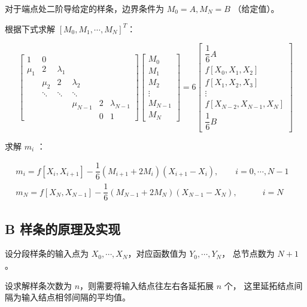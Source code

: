 \documentclass[lang=cn,a4paper,newtx,bibend=bibtex]{elegantpaper}
\begin{document}
对于端点处二阶导给定的样条，边界条件为 $M_0 = A, M_N = B$ （给定值）。

根据下式求解 $[M_0, M_1, \cdots, M_N]^T$：

\[
\begin{bmatrix}
  1 & 0 & & & & \\
  \mu_1 & 2 & \lambda_1 & & & \\
  & \mu_2 & 2 & \lambda_2 & &\\
  & \ddots & \ddots & \ddots & & \\
  & & & \mu_{N-1} & 2 & \lambda_{N-1} \\
  & & & & 0 & 1
\end{bmatrix}  
\begin{bmatrix}
  M_0 \\
  M_1 \\
  M_2 \\
  \vdots \\
  M_{N-1} \\
  M_N
\end{bmatrix}
 = 6
 \begin{bmatrix}
  \dfrac16 A\\
  f[X_0, X_1, X_2]\\
  f[X_1, X_2, X_3] \\
  \vdots \\
  f[X_{N-2}, X_{N-1}, X_N] \\
  \dfrac16 B
\end{bmatrix}
\]

求解 $m_i$ ：

\begin{equation*}
  \begin{aligned}
    m_i = f[X_i, X_{i + 1}] - \dfrac16 (M_{i + 1} + 2 M_i)(X_{i+1} - X_i), \quad\quad i = 0, \cdots, N-1&\\
    m_N = f[X_N, X_{N - 1}] - \dfrac16 (M_{N - 1} + 2 M_N)(X_{N-1} - X_N), \quad\quad\quad i = N&
  \end{aligned}
\end{equation*}


\subsection{B 样条的原理及实现}

设分段样条的输入点为 $X_0, \cdots, X_N$，对应函数值为 $Y_0, \cdots, Y_N$，
总节点数为 $N+1$。

设求解样条次数为 $n$，则需要将输入结点往左右各延拓展 $n$ 个，
这里延拓结点间隔为输入结点相邻间隔的平均值。
\end{document}
